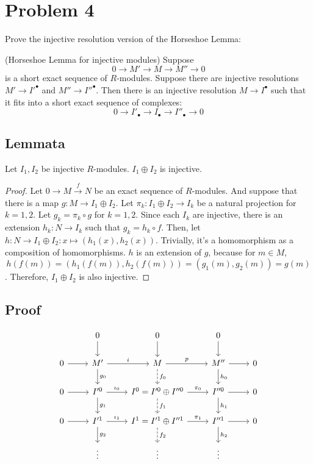 \section*{Problem 4}

Prove the injective resolution version of the Horseshoe Lemma:

\begin{theorem}
(Horseshoe Lemma for injective modules)
Suppose
\[0 \rightarrow M' \rightarrow M \rightarrow M'' \rightarrow 0\]
is a short exact sequence of \(R\)-modules.
Suppose there are injective resolutions
\(M' \to I'^\bullet\)
and
\(M'' \to I''^\bullet\).
Then there is an injective resolution \(M \to I^\bullet\)
such that it fits into a short exact sequence of complexes:
\[0 \rightarrow I'_\bullet \rightarrow I_\bullet \rightarrow I''_\bullet \rightarrow 0\]
\end{theorem}

\subsection*{Lemmata}

\begin{lemma}\label{lem-prod-inj}
  Let \(I_1, I_2\) be injective \(R\)-modules. \(I_1 \oplus I_2\) is injective.
\end{lemma}
\begin{proof}
  Let \(0 \to M \xrightarrow{f} N\) be an exact sequence of \(R\)-modules.
  And suppose that there is a map \(g: M \to I_1 \oplus I_2\).
  Let \(\pi_k: I_1 \oplus I_2 \to I_k\) be a natural projection for \(k = 1, 2\).
  Let \(g_k = \pi_k \circ g\) for \(k = 1, 2\).
  Since each \(I_k\) are injective, there is an extension \(h_k: N \to I_k\)
  such that \(g_k = h_k \circ f\).
  Then, let \(h: N \to I_1 \oplus I_2: x \mapsto (h_1(x), h_2(x))\).
  Trivially, it's a homomorphism as a composition of homomorphisms.
  \(h\) is an extension of \(g\), because for \(m \in M\),
  \[h(f(m)) = (h_1(f(m)), h_2(f(m))) = (g_1(m), g_2(m)) = g(m)\].
  Therefore, \(I_1 \oplus I_2\) is also injective.
\end{proof}


\subsection*{Proof}

\[
\begin{tikzcd}
& 0 \ar{d} & 0 \ar{d} & 0 \ar{d} & \\
0 \ar{r} & M' \ar["i"]{r} \ar["g_0"]{d} & M \ar["p"]{r} \ar[dashed, "f_0"]{d} & M'' \ar{r} \ar["h_0"]{d} & 0 \\
0 \ar{r} & I'^0 \ar["\iota_0"]{r} \ar["g_1"]{d} & I^0 = I'^0 \oplus I''^0 \ar["\pi_0"]{r} \ar[dashed,"f_1"]{d} & I''^0 \ar{r} \ar["h_1"]{d} & 0 \\
0 \ar{r} & I'^1 \ar["\iota_1"]{r} \ar["g_2"]{d} & I^1 = I'^1 \oplus I''^1 \ar["\pi_1"]{r} \ar[dashed,"f_2"]{d} & I''^1 \ar{r} \ar["h_2"]{d} & 0 \\
 & \vdots& \vdots & \vdots &
\end{tikzcd}
\]


